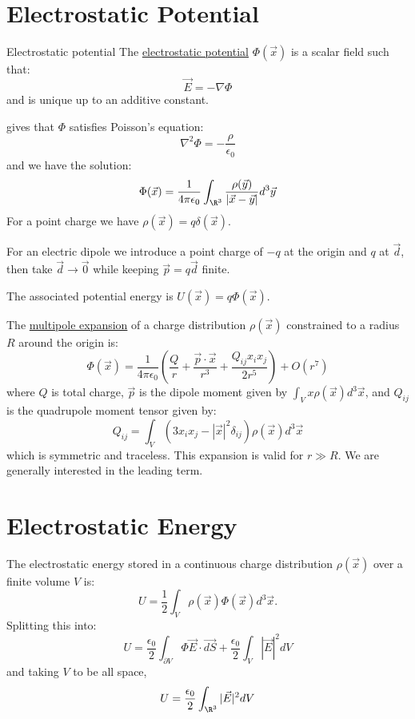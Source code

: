 \documentclass[../Main.tex]{subfiles}
\begin{document}
\section{Electrostatic Potential}
\begin{definition}{Electrostatic potential}
    The \underline{electrostatic potential} $\Phi(\vec{x})$ is a scalar field such that:
    \begin{equation*}
        \vec{E} = -\nabla \Phi
    \end{equation*}
    and is unique up to an additive constant.
\end{definition}
 gives that $\Phi$ satisfies Poisson's equation:
\begin{equation*}
    \nabla^2 \Phi = -\frac{\rho}{\epsilon_0}
\end{equation*}
and we have the solution:
\begin{equation*}
    \Phi(\vec{x}) = \frac1{4\pi\epsilon_0}\int_{\R^3} \frac{\rho(\vec{y})}{|\vec{x} - \vec{y}|} d^3\vec{y}
\end{equation*}
For a point charge we have $\rho(\vec{x}) = q\delta(\vec{x})$.

For an electric dipole we introduce a point charge of $-q$ at the origin and $q$ at $\vec{d}$, then take $\vec{d} \to \vec0$ while keeping $\vec{p} = q\vec{d}$ finite.

The associated potential energy is $U(\vec{x}) = q\Phi(\vec{x})$.

The \underline{multipole expansion} of a charge distribution $\rho(\vec{x})$ constrained to a radius $R$ around the origin is:
\begin{equation*}
    \Phi(\vec{x}) = \frac{1}{4\pi\epsilon_0} \left(\frac{Q}{r} + \frac{\vec{p} \cdot \vec{x}}{r^3} + \frac{Q_{ij} x_i x_j}{2r^5}\right) + O(r^7)
\end{equation*}
where $Q$ is total charge, $\vec{p}$ is the dipole moment given by $\int_V x\rho(\vec{x}) d^3\vec{x}$, and $Q_{ij}$ is the quadrupole moment tensor given by:
\begin{equation*}
    Q_{ij} = \int_V \left(3x_i x_j - |\vec{x}|^2 \delta_{ij}\right)\rho(\vec{x}) d^3\vec{x}
\end{equation*}
which is symmetric and traceless. This expansion is valid for $r \gg R$. We are generally interested in the leading term.
\section{Electrostatic Energy}
The electrostatic energy stored in a continuous charge distribution $\rho(\vec{x})$ over a finite volume $V$ is:
\begin{equation*}
    U = \frac12 \int_V \rho(\vec{x}) \Phi(\vec{x}) d^3\vec{x}.
\end{equation*}
Splitting this into:
\begin{equation*}
    U = \frac{\epsilon_0}{2} \int_{\partial V} \Phi \vec{E} \cdot \vec{dS} + \frac{\epsilon_0}{2} \int_V |\vec{E}|^2 dV
\end{equation*}
and taking $V$ to be all space,
\begin{equation*}
    U = \frac{\epsilon_0}{2}\int_{\R^3} |\vec{E}|^2 dV
\end{equation*}
\end{document}
